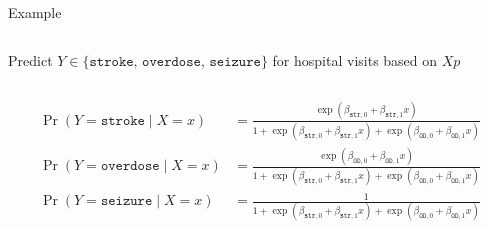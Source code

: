 \documentclass[aspectratio=169,usenames,dvipsnames]{beamer}
\begin{document}
\begin{frame}[c]{Example}

\begin{columns}
Predict $ Y \in \{\texttt{stroke, overdose, seizure}\}$
for hospital visits based on $Xp$
\centering


\end{columns}


\begin{align*}
	\Pr(Y = \texttt{stroke} \mid X = x) &= \frac{\exp(\beta_{\texttt{str},0} + \beta_{\texttt{str},1}x)}{1 + \exp(\beta_{\texttt{str},0} + \beta_{\texttt{str},1}x) + \exp(\beta_{\texttt{OD},0} + \beta_{\texttt{OD},1}x) }\\
	\Pr(Y = \texttt{overdose} \mid X = x) &= \frac{\exp(\beta_{\texttt{OD},0} + \beta_{\texttt{OD},1}x)}{1 + \exp(\beta_{\texttt{str},0} + \beta_{\texttt{str},1}x) + \exp(\beta_{\texttt{OD},0} + \beta_{\texttt{OD},1}x) }\\
	\Pr(Y = \texttt{seizure} \mid X = x) &= \frac{1}{1 + \exp(\beta_{\texttt{str},0} + \beta_{\texttt{str},1}x) + \exp(\beta_{\texttt{OD},0} + \beta_{\texttt{OD},1}x) }
\end{align*}

\end{frame}
\end{document}
